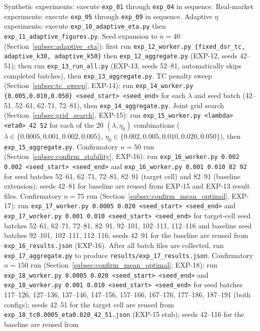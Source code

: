 \documentclass[conference]{IEEEtran}
\begin{document}
Synthetic experiments: execute \texttt{exp\_01} through \texttt{exp\_04}
in sequence. Real-market experiments: execute \texttt{exp\_05} through
\texttt{exp\_09} in sequence. Adaptive $\eta$ experiments:
execute \texttt{exp\_10\_adaptive\_eta.py} then
\texttt{exp\_11\_adaptive\_figures.py}.
Seed expansion to $n=40$ (Section~\ref{subsec:adaptive_eta}):
first run \texttt{exp\_12\_worker.py \{fixed\_dsr\_tc, adaptive\_k30, adaptive\_k50\}}
then \texttt{exp\_12\_aggregate.py} (EXP-12, seeds 42--51);
then run \texttt{exp\_13\_run\_all.py} (EXP-13, seeds 52--81,
automatically skips completed batches),
then \texttt{exp\_13\_aggregate.py}.
TC penalty sweep (Section~\ref{subsec:tc_sweep}, EXP-14):
run \texttt{exp\_14\_worker.py \{0.005,0.010,0.050\} <seed\_start> <seed\_end>}
for each $\lambda$ and seed batch (42--51, 52--61, 62--71, 72--81),
then \texttt{exp\_14\_aggregate.py}.
Joint grid search (Section~\ref{subsec:grid_search}, EXP-15):
run \texttt{exp\_15\_worker.py <lambda> <eta0> 42 52} for each of the
20 $(\lambda, \eta_0)$ combinations
($\lambda \in \{0.0005, 0.001, 0.002, 0.005\}$,
$\eta_0 \in \{0.002, 0.005, 0.010, 0.020, 0.050\}$),
then \texttt{exp\_15\_aggregate.py}.
Confirmatory $n=50$ run (Section~\ref{subsec:confirm_stability}, EXP-16):
run \texttt{exp\_16\_worker.py 0.002 0.002 <seed\_start> <seed\_end>}
and \texttt{exp\_16\_worker.py 0.001 0.010 82 92}
for seed batches 52--61, 62--71, 72--81, 82--91 (target cell)
and 82--91 (baseline extension); seeds 42--81 for baseline are
reused from EXP-15 and EXP-13 result files.
Confirmatory $n=75$ run (Section~\ref{subsec:confirm_mean_optimal}, EXP-17):
run \texttt{exp\_17\_worker.py 0.0005 0.020 <seed\_start> <seed\_end>}
and \texttt{exp\_17\_worker.py 0.001 0.010 <seed\_start> <seed\_end>}
for target-cell seed batches 52--61, 62--71, 72--81, 82--91,
92--101, 102--111, 112--116 and baseline seed batches
92--101, 102--111, 112--116; seeds 42--91 for the baseline
are reused from \texttt{exp\_16\_results.json} (EXP-16).
After all batch files are collected, run
\texttt{exp\_17\_aggregate.py} to produce
\texttt{results/exp\_17\_results.json}.
Confirmatory $n=150$ run (Section~\ref{subsec:confirm_mean_optimal}, EXP-18):
run \texttt{exp\_18\_worker.py 0.0005 0.020 <seed\_start> <seed\_end>}
and \texttt{exp\_18\_worker.py 0.001 0.010 <seed\_start> <seed\_end>}
for seed batches 117--126, 127--136, 137--146, 147--156,
157--166, 167--176, 177--186, 187--191 (both configs);
seeds 42--51 for the target cell are reused from
\texttt{exp\_18\_tc0.0005\_eta0.020\_42\_51.json} (EXP-15 stub);
seeds 42--116 for the baseline are reused from
\end{document}
